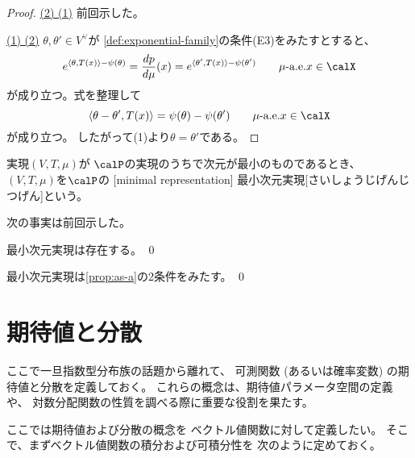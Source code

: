 \documentclass[report]{jlreq}
\begin{document}
\begin{proof}
    \uline{(2) \Rightarrow (1)} \quad
    前回示した。

    \uline{(1) \Rightarrow (2)} \quad
    $\theta, \theta' \in V^\vee$が
    \cref{def:exponential-family}の条件(E3)をみたすとすると、
    \begin{equation}
        e^{\langle \theta, T(x) \rangle - \psi(\theta)}
            = \dd[p]{\mu}(x)
            = e^{\langle \theta', T(x) \rangle - \psi(\theta')}
            \qquad
            \text{$\mu$-a.e.$x \in \calX$}
    \end{equation}
    が成り立つ。式を整理して
    \begin{equation}
        \langle \theta - \theta', T(x) \rangle
            = \psi(\theta) - \psi(\theta')
            \qquad
            \text{$\mu$-a.e.$x \in \calX$}
    \end{equation}
    が成り立つ。
    したがって(1)より$\theta = \theta'$である。
\end{proof}

\begin{definition}[最小次元実現]
    実現$(V, T, \mu)$が
    $\calP$の実現のうちで次元が最小のものであるとき、
    $(V, T, \mu)$を$\calP$の
    [minimal representation]
        {最小次元実現}[さいしょうじげんじつげん]という。
\end{definition}

次の事実は前回示した。

\begin{fact}
    最小次元実現は存在する。
    \qed
\end{fact}

\begin{fact}
    最小次元実現は\cref{prop:as-a}の2条件をみたす。
    \qed
\end{fact}

%
\section{期待値と分散}

ここで一旦指数型分布族の話題から離れて、
可測関数 (あるいは確率変数) の期待値と分散を定義しておく。
これらの概念は、期待値パラメータ空間の定義や、
対数分配関数の性質を調べる際に重要な役割を果たす。

ここでは期待値および分散の概念を
ベクトル値関数に対して定義したい。
そこで、まずベクトル値関数の積分および可積分性を
次のように定めておく。
\end{document}

